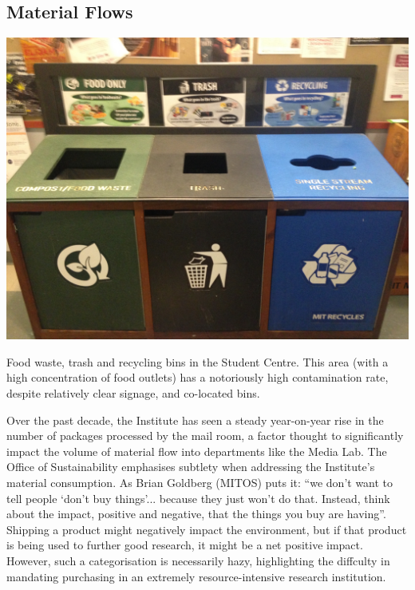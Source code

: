 \documentclass[nofonts,nols,justified,nobib]{tufte-book}
\begin{document}
\subsection*{Material Flows}

\begin{marginfigure}
\includegraphics[width=\textwidth]{img/2/mit-bins/trash6}
\caption{Food waste, trash and recycling bins in the Student Centre. This area (with a high concentration of food outlets) has a notoriously high contamination rate, despite relatively clear signage, and co-located bins.}
\end{marginfigure}

Over the past decade, the Institute has seen a steady year-on-year rise in the number of packages processed by the mail room, a factor thought to significantly impact the volume of material flow into departments like the Media Lab. The Office of Sustainability emphasises subtlety when addressing the Institute's material consumption. As Brian Goldberg (MITOS) puts it: ``we don't want to tell people `don't buy things'... because they just won't do that. Instead, think about the impact, positive and negative, that the things you buy are having''. Shipping a product might negatively impact the environment, but if that product is being used to further good research, it might be a net positive impact. However, such a categorisation is necessarily hazy, highlighting the diffculty in mandating purchasing in an extremely resource-intensive research institution.

\end{document}
